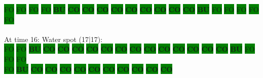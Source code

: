 \colorbox{green}{\color[gray]{0.75}FO}%
\colorbox{green}{\color[gray]{0.75}FO}%
\colorbox{green}{\color[gray]{0.75}FO}%
\colorbox{green}{\color[gray]{0.75}FO}%
\colorbox{green}{\color[rgb]{1,0,0}\textbf{BU}}%
\colorbox{green}{\color[rgb]{0,0,0}\textbf{CO}}%
\colorbox{green}{\color[rgb]{0,0,0}\textbf{CO}}%
\colorbox{green}{\color[rgb]{0,0,0}\textbf{CO}}%
\colorbox{green}{\color[rgb]{0,0,0}\textbf{CO}}%
\colorbox{green}{\color[rgb]{0,0,0}\textbf{CO}}%
\colorbox{green}{\color[rgb]{0,0,0}\textbf{CO}}%
\colorbox{green}{\color[rgb]{0,0,0}\textbf{CO}}%
\colorbox{green}{\color[rgb]{0,0,0}\textbf{CO}}%
\colorbox{green}{\color[rgb]{0,0,0}\textbf{CO}}%
\colorbox{green}{\color[rgb]{1,0,0}\textbf{BU}}%
\colorbox{green}{\color[gray]{0.75}FO}%
\colorbox{green}{\color[gray]{0.75}FO}%
\colorbox{green}{\color[gray]{0.75}FO}%
\colorbox{green}{\color[gray]{0.75}FO}%
\colorbox{green}{\color[gray]{0.75}FO}%
\\
\\
At time 16: Water spot (17|17):
\\
\colorbox{green}{\color[gray]{0.75}FO}%
\colorbox{green}{\color[gray]{0.75}FO}%
\colorbox{green}{\color[rgb]{1,0,0}\textbf{BU}}%
\colorbox{green}{\color[rgb]{0,0,0}\textbf{CO}}%
\colorbox{green}{\color[rgb]{0,0,0}\textbf{CO}}%
\colorbox{green}{\color[rgb]{0,0,0}\textbf{CO}}%
\colorbox{green}{\color[rgb]{0,0,0}\textbf{CO}}%
\colorbox{green}{\color[rgb]{0,0,0}\textbf{CO}}%
\colorbox{green}{\color[rgb]{0,0,0}\textbf{CO}}%
\colorbox{green}{\color[rgb]{0,0,0}\textbf{CO}}%
\colorbox{green}{\color[rgb]{0,0,0}\textbf{CO}}%
\colorbox{green}{\color[rgb]{0,0,0}\textbf{CO}}%
\colorbox{green}{\color[rgb]{0,0,0}\textbf{CO}}%
\colorbox{green}{\color[rgb]{0,0,0}\textbf{CO}}%
\colorbox{green}{\color[rgb]{0,0,0}\textbf{CO}}%
\colorbox{green}{\color[rgb]{0,0,0}\textbf{CO}}%
\colorbox{green}{\color[rgb]{1,0,0}\textbf{BU}}%
\colorbox{green}{\color[gray]{0.75}FO}%
\colorbox{green}{\color[gray]{0.75}FO}%
\colorbox{green}{\color[gray]{0.75}FO}%
\\
\colorbox{green}{\color[gray]{0.75}FO}%
\colorbox{green}{\color[rgb]{1,0,0}\textbf{BU}}%
\colorbox{green}{\color[rgb]{0,0,0}\textbf{CO}}%
\colorbox{green}{\color[rgb]{0,0,0}\textbf{CO}}%
\colorbox{green}{\color[rgb]{0,0,0}\textbf{CO}}%
\colorbox{green}{\color[rgb]{0,0,0}\textbf{CO}}%
\colorbox{green}{\color[rgb]{0,0,0}\textbf{CO}}%
\colorbox{green}{\color[rgb]{0,0,0}\textbf{CO}}%
\colorbox{green}{\color[rgb]{0,0,0}\textbf{CO}}%
\colorbox{green}{\color[rgb]{0,0,0}\textbf{CO}}%
\colorbox{green}{\color[rgb]{0,0,0}\textbf{CO}}%
\colorbox{green}{\color[rgb]{0,0,0}\textbf{CO}}%
